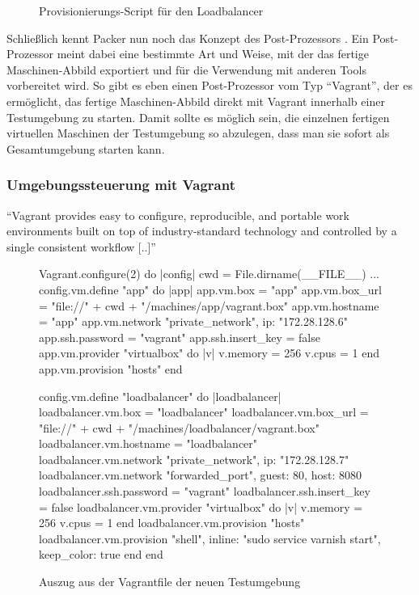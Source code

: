 \begin{figure}[!ht]
  \begin{center}
    \caption{Provisionierungs-Script für den Loadbalancer}
    \label{Loadbalancer-Install}
  \end{center}
\end{figure}

Schließlich kennt Packer nun noch das Konzept des Post-Prozessors \citep[Vgl.][]{Packer:003}. Ein Post-Prozessor meint dabei eine bestimmte Art und Weise, mit der das fertige Maschinen-Abbild exportiert und für die Verwendung mit anderen Tools vorbereitet wird. So gibt es eben einen Post-Prozessor vom Typ "`Vagrant"', der es ermöglicht, das fertige Maschinen-Abbild direkt mit Vagrant innerhalb einer Testumgebung zu starten. Damit sollte es möglich sein, die einzelnen fertigen virtuellen Maschinen der Testumgebung so abzulegen, dass man sie sofort als Gesamtumgebung starten kann.

\subsubsection{Umgebungssteuerung mit Vagrant}

"`Vagrant provides easy to configure, reproducible, and portable work environments built on top of industry-standard technology and controlled by a single consistent workflow [..]"' \citep[S.][]{Vagrant:001}

\begin{figure}[!ht]
  \begin{center}
    \begin{rubycode}
Vagrant.configure(2) do |config|
    cwd = File.dirname(__FILE__)
    ...
    config.vm.define "app" do |app|
        app.vm.box = "app"
        app.vm.box_url = "file://" + cwd + "/machines/app/vagrant.box"
        app.vm.hostname = "app"
        app.vm.network "private_network", ip: "172.28.128.6"
        app.ssh.password = "vagrant"
        app.ssh.insert_key = false
        app.vm.provider "virtualbox" do |v|
            v.memory = 256
            v.cpus = 1
        end
        app.vm.provision "hosts"
    end
    
    config.vm.define "loadbalancer" do |loadbalancer|
        loadbalancer.vm.box = "loadbalancer"     
        loadbalancer.vm.box_url = "file://"
            + cwd + "/machines/loadbalancer/vagrant.box"
        loadbalancer.vm.hostname = "loadbalancer"
        loadbalancer.vm.network "private_network", ip: "172.28.128.7"
        loadbalancer.vm.network "forwarded_port", guest: 80, host: 8080
        loadbalancer.ssh.password = "vagrant"
        loadbalancer.ssh.insert_key = false
        loadbalancer.vm.provider "virtualbox" do |v|
            v.memory = 256
            v.cpus = 1
        end
        loadbalancer.vm.provision "hosts"
        loadbalancer.vm.provision "shell",
            inline: "sudo service varnish start",
            keep_color: true
    end
end
    \end{rubycode}
    \caption{Auszug aus der Vagrantfile der neuen Testumgebung}
    \label{Vagrantfile}
  \end{center}
\end{figure}

